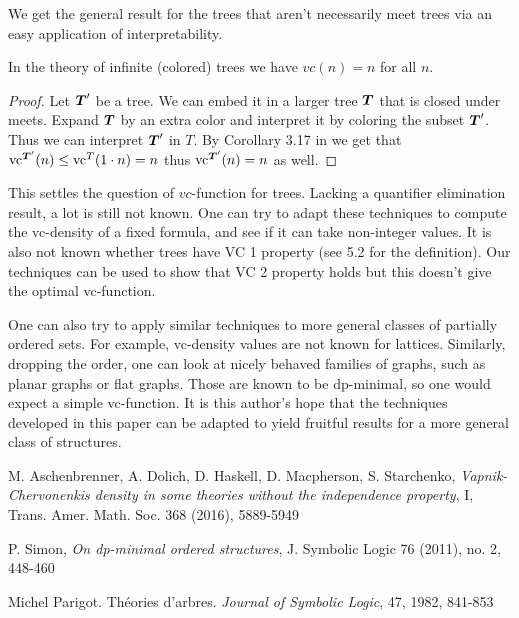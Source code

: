 \documentclass{amsart}
\DeclareMathOperator{\TT}{\boldface T}
\begin{document}
We get the general result for the trees that aren't necessarily meet trees via an easy application of interpretability.
\begin{Corollary}
  In the theory of infinite (colored) trees we have $vc(n) = n$ for all $n$.
\end{Corollary}
\begin{proof}
  Let $\TT'$ be a tree. We can embed it in a larger tree $\TT$ that is closed under meets. Expand $\TT$ by an extra color and interpret it by coloring the subset $\TT'$. Thus we can interpret $\TT'$ in $T$. By Corollary 3.17 in \cite{density} we get that $\vc^{\TT'}(n) \leq \vc^T(1 \cdot n) = n$ thus $\vc^{\TT'}(n) = n$ as well.
\end{proof}

This settles the question of $vc$-function for trees. Lacking a quantifier elimination result, a lot is still not known.
One can try to adapt these techniques to compute the vc-density of a fixed formula, and see if it can take non-integer values.
It is also not known whether trees have VC 1 property (see \cite{density} 5.2 for the definition).
Our techniques can be used to show that VC 2 property holds but this doesn't give the optimal vc-function.

One can also try to apply similar techniques to more general classes of partially ordered sets.
For example, vc-density values are not known for lattices.
Similarly, dropping the order, one can look at nicely behaved families of graphs, such as planar graphs or flat graphs.
Those are known to be dp-minimal, so one would expect a simple vc-function.
It is this author's hope that the techniques developed in this paper can be adapted to yield fruitful results for a more general class of structures.

\begin{thebibliography}{9}

  M. Aschenbrenner, A. Dolich, D. Haskell, D. Macpherson, S. Starchenko,
  \textit{Vapnik-Chervonenkis density in some theories without the independence property}, I,
  Trans. Amer. Math. Soc. 368 (2016), 5889-5949

  P. Simon,
  \textit{On dp-minimal ordered structures},
  J. Symbolic Logic 76 (2011), no. 2, 448-460

  Michel Parigot.
  Th\'eories d'arbres.
  \textit{Journal of Symbolic Logic}, 47, 1982, 841-853
  
  
\end{thebibliography}
\end{document}

